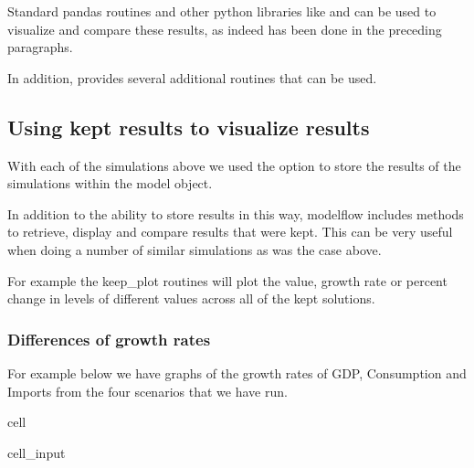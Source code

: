 \documentclass[letterpaper,10pt,english]{jupyterBook}
\begin{document}
\sphinxAtStartPar
Standard pandas routines and other python libraries like  and  can be used to visualize and compare these results, as indeed has been done in the preceding paragraphs.

\sphinxAtStartPar
In addition,  provides several additional routines that can be used.


\subsection{Using kept results to visualize results}
\label{\detokenize{content/06_WBModels/LoadingWBModel:using-kept-results-to-visualize-results}}
\sphinxAtStartPar
With each of the simulations above we used the  option to store the results of the simulations within the model object.

\sphinxAtStartPar
In addition to the ability to store results in this way, modelflow includes methods to retrieve, display and compare results that were kept.  This can be very useful when doing a number of similar simulations as was the case above.

\sphinxAtStartPar
For example the keep\_plot routines will plot the value, growth rate or percent change in levels of different values across all of the kept solutions.


\subsubsection{Differences of growth rates}
\label{\detokenize{content/06_WBModels/LoadingWBModel:differences-of-growth-rates}}
\sphinxAtStartPar
For example below we have graphs of the growth rates of GDP, Consumption and Imports from the four scenarios that we have run.

\begin{sphinxuseclass}{cell}\begin{sphinxVerbatimInput}

\begin{sphinxuseclass}{cell_input}
\begin{sphinxVerbatim}[commandchars=\\\{\}]
 \PYGZbs{}
                \PYGZbs{}
\end{sphinxVerbatim}

\end{sphinxuseclass}\end{sphinxVerbatimInput}

\end{sphinxuseclass}
\end{document}
